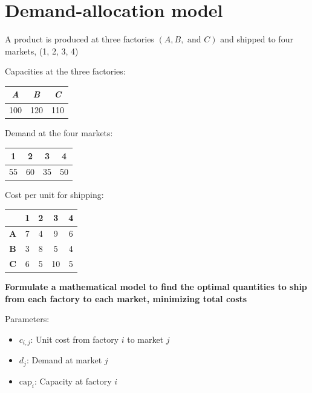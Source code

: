 \documentclass[10pt]{article}
\begin{document}
\section{Demand-allocation model}

A product is produced at three factories $(A, B, \text{ and } C)$ and shipped to four markets, (1, 2, 3, 4)

Capacities at the three factories: 
\begin{center}
    \begin{tabular}{|c|c|c|}
        \hline 
        \textbf{\textit{A}} & \textbf{\textit{B}} & \textbf{\textit{C}} \\\hline 
        100 & 120 & 110 \\\hline 
    \end{tabular}
\end{center}

Demand at the four markets: 
\begin{center}
    \begin{tabular}{|c|c|c|c|}
        \hline 
        \textbf{1} & \textbf{2} & \textbf{3} & \textbf{4} \\\hline 
        55 & 60 & 35 & 50 \\\hline 
    \end{tabular}
\end{center}

Cost per unit for shipping: 
\begin{center}
    \begin{tabular}{|c|c|c|c|c|}
        \hline 
        & \textbf{1} & \textbf{2} & \textbf{3} & \textbf{4} \\\hline 
        \textbf{A} & 7 & 4 & 9 & 6 \\\hline 
        \textbf{B} & 3 & 8 & 5 & 4 \\\hline 
        \textbf{C} & 6 & 5 & 10 & 5 \\\hline 
    \end{tabular}
\end{center}

\textbf{Formulate a mathematical model to find the optimal quantities to ship from each factory to each market, minimizing total costs}

Parameters: 
\begin{itemize}
    \item $c_{i, j}$: Unit cost from factory $i $ to market $j $
    \item $d_j$: Demand at market $j $
    \item $\text{cap}_i $: Capacity at factory $i $
\end{itemize}
\end{document}
